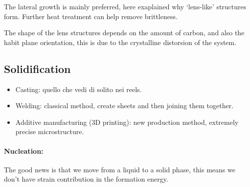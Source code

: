 The lateral growth is mainly preferred, here exaplained why `lens-like' structures form.
Further heat treatment can help remove brittleness.

The shape of the lens structures depends on the amount of carbon, and also the habit plane orientation, this is due to the crystalline distorsion of the system. 

\subsection{Solidification}

\begin{itemize}
    \item Casting: quello che vedi di solito nei reels.
    \item Welding: classical method, create sheets and then joining them together.
    \item Additive manufacturing (3D printing): new production method, extremely precise microstructure.
\end{itemize}

\paragraph{Nucleation:} The good news is that we move from a liquid to a solid phase, this means we don't have strain contribution in the formation energy.
